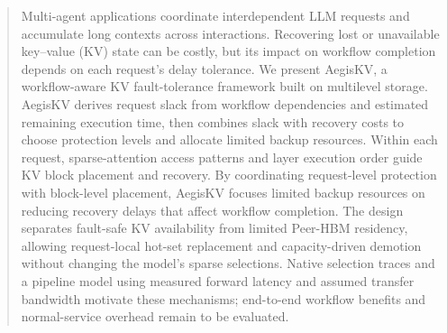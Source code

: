 \begin{abstract}
Multi-agent applications coordinate interdependent LLM requests and
accumulate long contexts across interactions. Recovering lost or
unavailable key--value (KV) state can be costly, but its impact on workflow
completion depends on each request's delay tolerance. We present AegisKV,
a workflow-aware KV fault-tolerance framework built on multilevel storage.
AegisKV derives request slack from workflow dependencies and estimated
remaining execution time, then combines slack with recovery costs to
choose protection levels and allocate limited backup resources. Within
each request, sparse-attention access patterns and layer execution order
guide KV block placement and recovery. By coordinating request-level
protection with block-level placement, AegisKV focuses limited backup
resources on reducing recovery delays that affect workflow completion.
The design separates fault-safe KV availability from limited Peer-HBM
residency, allowing request-local hot-set replacement and capacity-driven
demotion without changing the model's sparse selections. Native selection
traces and a pipeline model using measured forward latency and assumed
transfer bandwidth motivate these mechanisms;
end-to-end workflow benefits and normal-service overhead remain to be evaluated.
\end{abstract}
